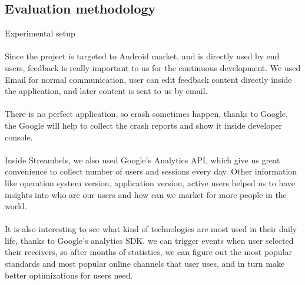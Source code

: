 \subsection{Evaluation methodology}
Experimental setup\\
\\
Since the project is targeted to Android market, and is directly used by
end users, feedback is really important to us for the continuous development. We
used Email for normal communication, user can edit feedback content directly
inside the application, and later content is sent to us by email.\\
\\
There is no perfect application, so crash sometimes happen, thanks to Google,
the Google will help to collect the crash reports and show it inside developer
console.\\
\\
Inside Streambels, we also used Google's Analytics API, which give us
great convenience to collect number of users and sessions every day. Other
information like operation system version, application version, active users
helped us to have insights into who are our users and how can we market for more
people in the world.\\
\\
It is also interesting to see what kind of technologies are most used in their
daily life, thanks to Google's analytics SDK, we can trigger events when user
selected their receivers, so after months of statistics, we can figure out the
most popular standards and most popular online channels that user uses, and in
turn make better optimizations for users need.
